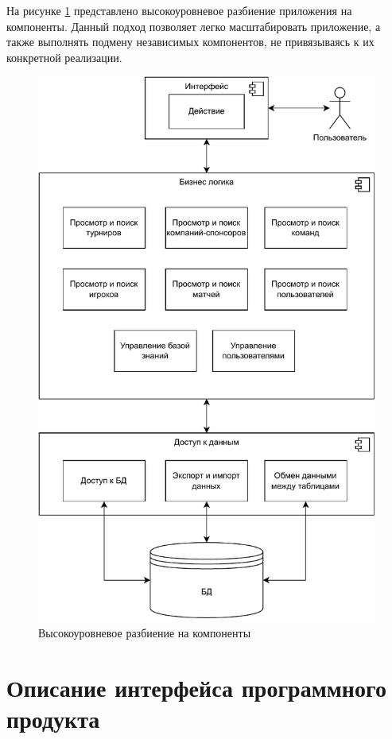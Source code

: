 На рисунке \ref{fig:components} представлено высокоуровневое разбиение приложения на компоненты. Данный подход позволяет легко масштабировать приложение, а также выполнять подмену независимых компонентов, не привязываясь к их конкретной реализации.

\begin{figure}[h!btp]
	\centering
	\includegraphics[scale = 0.9]{inc/diag/components.pdf}
	\caption{Высокоуровневое разбиение на компоненты}
	\label{fig:components}	
\end{figure}

\clearpage


\section{Описание интерфейса программного продукта}



